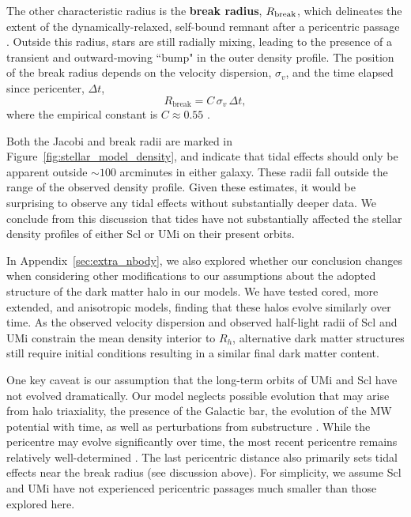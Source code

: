 \documentclass[linenumbers, twocolumn, twocolappendix]{aastex701}
\begin{document}
The other characteristic radius is the  \textbf{break radius}, $R_{\rm break}$, which delineates the extent of the dynamically-relaxed, self-bound remnant after a pericentric passage \citep{aguilar+white1986, navarro1989}. Outside this radius, stars are still radially mixing, leading to the presence of a transient and outward-moving ``bump" in the outer density profile. The position of the break radius depends on the velocity dispersion, $\sigma_v$, and the time elapsed
since pericenter, $\Delta t$, 
\begin{equation}\label{eq:r_break}
    R_\text{break} = C\,\sigma_{v}\,\Delta t,
\end{equation} 
where the empirical constant is $C \approx 0.55$  \citep{penarrubia+2009}.

Both the Jacobi and break radii are marked in Figure~\ref{fig:stellar_model_density}, and indicate that tidal effects should only  be apparent outside ${\sim}100$ arcminutes in either galaxy. 
These radii fall outside the range of the observed density profile. Given these estimates, it would be surprising to observe any tidal effects without substantially deeper data. We conclude from this discussion that tides have not substantially affected the stellar density profiles of either Scl or UMi on their present orbits.


In Appendix~\ref{sec:extra_nbody}, we also explored whether our conclusion changes when considering other modifications to our assumptions about the adopted structure of the dark matter halo in our models. We have tested cored, more extended, and anisotropic models, finding that these halos evolve similarly over time. As the observed velocity dispersion and observed half-light radii of Scl and UMi constrain the mean density interior to $R_h$, alternative dark matter structures still require initial conditions resulting in a similar final dark matter content. 

One key caveat is our assumption that the long-term orbits of UMi and Scl have not evolved dramatically. Our model neglects possible evolution that may arise from halo triaxiality, the presence of the Galactic bar, the evolution of the MW potential with time, as well as perturbations from substructure
\citep[e.g.,][]{dsouza+bell2022}. 
While the pericentre may evolve significantly over time, the most recent pericentre remains relatively well-determined \citep{santistevan+2024}. The last pericentric distance also primarily sets tidal effects near the break radius (see discussion above).
For simplicity, we assume Scl and UMi have not experienced pericentric passages much smaller than those explored here.
\end{document}

